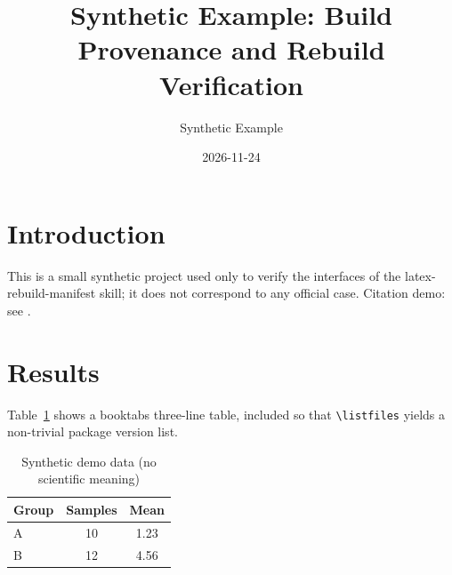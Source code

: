 \documentclass[11pt]{article}
\title{Synthetic Example: Build Provenance and Rebuild Verification}
\author{Synthetic Example}
\date{2026-11-24}
\begin{document}
\maketitle

\section{Introduction}
This is a small synthetic project used only to verify the interfaces of the
latex-rebuild-manifest skill; it does not correspond to any official case.
Citation demo: see \cite{knuth1984texbook}.



\section{Results}
Table~\ref{tab:demo} shows a booktabs three-line table, included so that
\verb|\listfiles| yields a non-trivial package version list.

\begin{table}[htbp]
  \centering
  \caption{Synthetic demo data (no scientific meaning)}
  \label{tab:demo}
  \begin{tabular}{lcc}
    \toprule
    Group & Samples & Mean \\
    \midrule
    A & 10 & 1.23 \\
    B & 12 & 4.56 \\
    \bottomrule
  \end{tabular}
\end{table}



\end{document}
